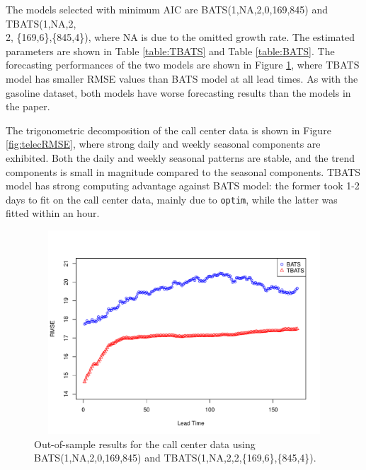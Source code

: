 \documentclass{uwstat572}
\begin{document}
The models selected with minimum AIC are BATS(1,NA,2,0,169,845) and TBATS(1,NA,2,\\2, \{169,6\},\{845,4\}), where NA is due to the omitted growth rate. The estimated parameters are shown in Table \ref{table:TBATS} and Table \ref{table:BATS}. The forecasting performances of the two models are shown in Figure \ref{fig:callsRMSE}, where TBATS model has smaller RMSE values than BATS model at all lead times. As with the gasoline dataset, both models have worse forecasting results than the models in the paper.

The trigonometric decomposition of the call center data is shown in Figure \ref{fig:telecRMSE}, where strong daily and weekly seasonal components are exhibited. Both the daily and weekly seasonal patterns are stable, and the trend components is small in magnitude compared to the seasonal components. TBATS model has strong computing advantage against BATS model: the former took 1-2 days to fit on the call center data, mainly due to \texttt{optim}, while the latter was fitted within an hour. 


\begin{figure}[]
\centering
  \includegraphics[width=6in,height=3in]{callsRMSE.pdf}
  \caption{Out-of-sample results for the call center data using BATS(1,NA,2,0,169,845) and TBATS(1,NA,2,2,\{169,6\},\{845,4\}).}
  \label{fig:callsRMSE}
\end{figure}
\end{document}
